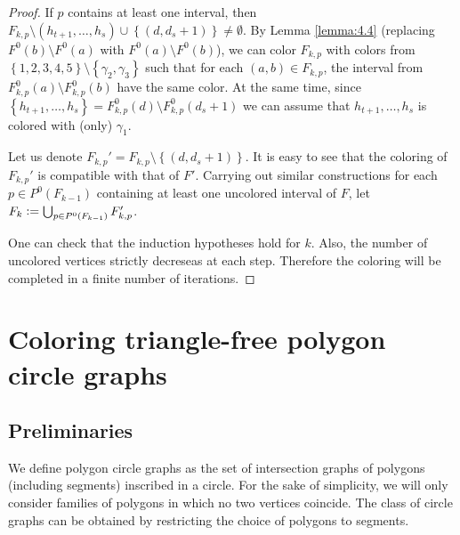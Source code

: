 \documentclass[12pt]{article}
\theoremstyle{definition}
\newcommand{\defeq}{\vcentcolon=}
\begin{document}
\begin{proof}
        If $p$ contains at least one interval,
        then $F_{k, p} \setminus \left(h_{t+1},
        \ldots, h_{s}\right) \cup 
        \left\{\left(d, d_{s} + 1\right)\right\}
        \neq \emptyset$.
        By Lemma \ref{lemma:4.4}
        (replacing $F^{0}\left(b\right)
        \setminus F^{0}\left(a\right)$
        with $F^{0}\left(a\right)
        \setminus F^{0}\left(b\right)$),
        we can color $F_{k, p}$ 
        with colors from
        $\left\{1,2,3,4,5\right\} \setminus 
        \left\{\gamma_2, \gamma_3\right\}$
        such that
        for each
        $\left(a, b\right) \in 
        F_{k, p}$,
        the interval from
        $F^{0}_{k, p}\left(a\right) \setminus 
        F^{0}_{k, p}\left(b\right)$
        have the same color.
        At the same time,
        since $\left\{h_{t+1},
        \ldots, h_{s}\right\}
        = F^{0}_{k, p}\left(d\right)
        \setminus F^{0}_{k, p}\left(d_{s} + 1\right)$
        we can assume that 
        $h_{t+1}, \ldots,
        h_{s}$ is colored 
        with (only) $\gamma_1$.
        
        Let us denote $F_{k, p}' = 
        F_{k, p} \setminus \left\{
        \left(d, d_{s} + 1\right)\right\}$.
        It is easy to see that the coloring of
        $F_{k, p}'$ is compatible
        with that of
        $F'$.
        Carrying out similar constructions
        for each $p \in P^{0}\left(F_{k-1}\right)$
        containing at least one uncolored
        interval of $F$, let
        $F_{k} \defeq \bigcup_{p \in 
        P^{0}\left(F_{k-1}\right)} F_{k, p}'$.

        One can check that the 
        induction hypotheses hold
        for $k$.
        Also, the number of uncolored
        vertices strictly decreseas 
        at each step. Therefore
        the coloring will be 
        completed in a finite
        number of iterations.
    \end{proof}
    
    \section{Coloring triangle-free polygon circle graphs}
    
    \subsection{Preliminaries}

    We define polygon circle
    graphs as the set of intersection
    graphs of polygons
    (including segments)
    inscribed in a circle.
    For the sake of simplicity,
    we will only consider
    families of polygons
    in which no two
    vertices coincide.
    The class of circle
    graphs can be obtained
    by restricting the
    choice of polygons
    to segments.
\end{document}
